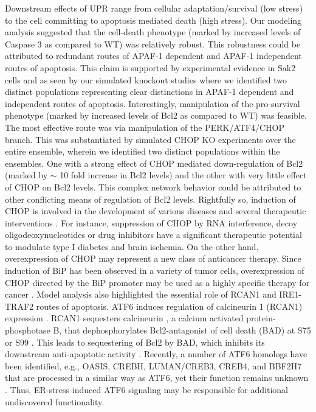 \documentclass[fleqn,10pt]{wlscirep}
\begin{document}
Downstream effects of UPR range from cellular adaptation/survival (low stress) to the cell committing to apoptosis mediated death (high stress).
Our modeling analysis suggested that the cell-death phenotype (marked by increased levels of Caspase 3 as compared to WT) was relatively robust.
This robustness could be attributed to redundant routes of APAF-1 dependent and APAF-1 independent routes of apoptosis.
This claim is supported by experimental evidence in Sak2 cells \cite{rao2002cer} and as seen by our simulated knockout studies where we identified two distinct populations representing clear distinctions in APAF-1 dependent and independent routes of apoptosis.
Interestingly, manipulation of the pro-survival phenotype (marked by increased levels of Bcl2 as compared to WT) was feasible.
The most effective route was via manipulation of the PERK/ATF4/CHOP branch. This was substantiated by simulated CHOP KO experiments over the entire ensemble, wherein we identified two distinct populations within the ensembles.
One with a strong effect of CHOP mediated down-regulation of Bcl2 (marked by $\sim$ 10 fold increase in Bcl2 levels) and the other with very little effect of CHOP on Bcl2 levels.
This complex network behavior could be attributed to other conflicting means of regulation of Bcl2 levels. Rightfully so, induction of CHOP is involved in the development of various diseases and several therapeutic interventions \cite{oyadomari2003rcg}.
For instance, suppression of CHOP by RNA interference, decoy oligodeoxynucleotides or drug inhibitors have a significant therapeutic potential to modulate type I diabetes and brain ischemia.
On the other hand, overexpression of CHOP may represent a new class of anticancer therapy. Since induction of BiP has been observed in a variety of tumor cells, overexpression of CHOP directed by the BiP promoter may be used as a highly specific therapy for cancer \cite{oyadomari2003rcg}.
Model analysis also highlighted the essential role of RCAN1 and IRE1-TRAF2 routes of apoptosis. ATF6 induces regulation of calcineurin 1 (RCAN1) expression \cite{belmont2008cga}. RCAN1 sequesters calcineurin \cite{belmont2008cga}, a calcium activated protein-phosphotase B, that dephosphorylates Bcl2-antagonist of cell death (BAD) at S75 or S99 \cite{wang1999cia}.
This leads to sequestering of Bcl2 by BAD, which inhibits its downstream anti-apoptotic activity \cite{wang1999cia}. Recently, a number of ATF6 homologs have been identified, e.g., OASIS, CREBH, LUMAN/CREB3, CREB4, and BBF2H7 that are processed in a similar way as ATF6, yet their function remains unknown \cite{Ron:2007rq}.
Thus, ER-stress induced ATF6 signaling may be responsible for additional undiscovered functionality.
\end{document}
